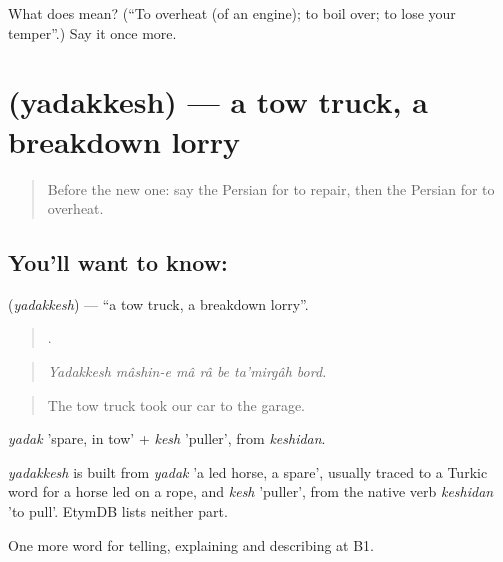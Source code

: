 \begin{tcolorbox}[breakable,colback=teal!4,colframe=teal!35!black,title={Before you move on}]
What does   mean? (\textquotedblleft{}To overheat (of an engine); to boil over; to lose your temper\textquotedblright{}.) Say it once more.
\end{tcolorbox}
\section[\texorpdfstring{\fa{یدک} \fa{کش} (yadakkesh)}{یدک کش (yadakkesh)}]{  (yadakkesh) — a tow truck, a breakdown lorry}

\label{lesson:FA-C427-yadakkesh}



\begin{quote}
Before the new one: say the Persian for to repair, then the Persian for to overheat.
\end{quote}

\subsection*{You'll want to know:  }
\textbf{ } (\emph{yadakkesh}) — \textquotedblleft{}a tow truck, a breakdown lorry\textquotedblright{}.

\begin{quote}
       .
\end{quote}

\begin{quote}
\emph{Yadakkesh mâshin-e mâ râ be ta'mirgâh bord.}
\end{quote}

\begin{quote}
The tow truck took our car to the garage.
\end{quote}

\emph{yadak} 'spare, in tow' + \emph{kesh} 'puller', from \emph{keshidan}.

\begin{cousinweb}
\emph{yadakkesh} is built from \emph{yadak} 'a led horse, a spare', usually traced to a Turkic word for a horse led on a rope, and \emph{kesh} 'puller', from the native verb \emph{keshidan} 'to pull'. EtymDB lists neither part.
\end{cousinweb}

\begin{grammarlens}[title={What you've built}]
One more word for telling, explaining and describing at B1.
\end{grammarlens}

